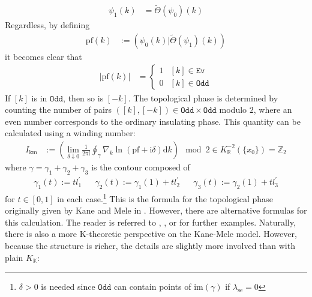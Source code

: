 \begin{align*}
  \psi_{1}(k)
  &=
  \tilde{\Theta}(\psi_{0})(k)
\end{align*}
Regardless, by defining
\begin{align*}
  \mathrm{pf}(k)
  &:=
  (\psi_{0}(k) \vert \tilde{\Theta}(\psi_{1})(k))
\end{align*}
it becomes clear that
\begin{align*}
  \vert
    \mathrm{pf}(k)
  \vert
  &=
  \begin{cases}
    1
    & 
    [k] \in \mathtt{Ev}
    \\
    0
    &
    [k] \in \mathtt{Odd}
  \end{cases}
\end{align*}
If $[k]$ is in $\mathtt{Odd}$, then so is $[-k]$.
The topological phase is determined by counting the number of pairs $([k],[-k]) \in \mathtt{Odd} \times \mathtt{Odd}$ modulo $2$, where an even number corresponds to the ordinary insulating phase.
This quantity can be calculated using a winding number:
\begin{align*}
  I_{\textrm{km}}
  &:=
  \left(
    \lim_{\delta \downarrow 0}
    \frac{1}{2\pi\mathrm{i}}
    \oint_{\gamma}
    \nabla_{k}
    \ln(\mathrm{pf} + \mathrm{i}\delta)
    \mathrm{d}k
  \right)
  \mod
  2
  \in
  K_{\mathbb{R}}^{-2}(\lbrace x_{0} \rbrace)
  =
  \mathbb{Z}_{2}
\end{align*}
where $\gamma = \gamma_{1} + \gamma_{2} + \gamma_{3}$ is the contour composed of
\begin{align*}
  \gamma_{1}(t)
  :=
  tl_{1}^{\prime}
  &&
  \gamma_{2}(t)
  :=
  \gamma_{1}(1)
  +
  tl_{2}^{\prime}
  &&
  \gamma_{3}(t)
  :=
  \gamma_{2}(1)
  +
  tl_{3}^{\prime}
\end{align*}
for $t \in [0,1]$ in each case.\footnote{$\delta > 0$ is needed since $\mathtt{Odd}$ can contain points of $\mathrm{im}(\gamma)$ if $\lambda_{\textrm{se}} = 0$}
This is the formula for the topological phase originally given by Kane and Mele in \cite{04d6b664}.
However, there are alternative formulas for this calculation.
The reader is referred to \cite{fa76af21}, \cite{f6db8935}, or \cite{6ab9663f} for further examples.
Naturally, there is also a more K-theoretic perspective on the Kane-Mele model.
However, because the structure is richer, the details are slightly more involved than with plain $K_{\mathbb{K}}$:
\\
